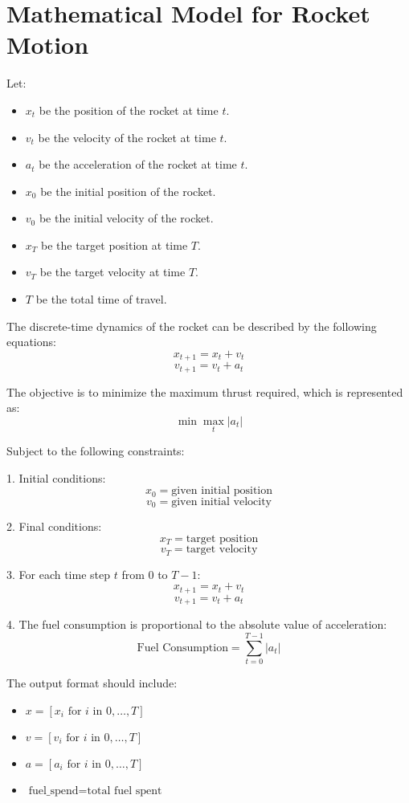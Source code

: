 \documentclass{article}
\begin{document}
\section*{Mathematical Model for Rocket Motion}

Let:
\begin{itemize}
    \item \( x_t \) be the position of the rocket at time \( t \).
    \item \( v_t \) be the velocity of the rocket at time \( t \).
    \item \( a_t \) be the acceleration of the rocket at time \( t \).
    \item \( x_0 \) be the initial position of the rocket.
    \item \( v_0 \) be the initial velocity of the rocket.
    \item \( x_T \) be the target position at time \( T \).
    \item \( v_T \) be the target velocity at time \( T \).
    \item \( T \) be the total time of travel.
\end{itemize}

The discrete-time dynamics of the rocket can be described by the following equations:
\[
x_{t+1} = x_t + v_t
\]
\[
v_{t+1} = v_t + a_t
\]

The objective is to minimize the maximum thrust required, which is represented as:
\[
\min \max_{t} |a_t|
\]

Subject to the following constraints:

1. Initial conditions:
    \[
    x_0 = \text{given initial position}
    \]
    \[
    v_0 = \text{given initial velocity}
    \]

2. Final conditions:
    \[
    x_T = \text{target position}
    \]
    \[
    v_T = \text{target velocity}
    \]

3. For each time step \( t \) from 0 to \( T-1 \):
    \[
    x_{t+1} = x_t + v_t
    \]
    \[
    v_{t+1} = v_t + a_t
    \]

4. The fuel consumption is proportional to the absolute value of acceleration:
   \[
   \text{Fuel Consumption} = \sum_{t=0}^{T-1} |a_t|
   \]

The output format should include:
\begin{itemize}
    \item \( x = [x_i \text{ for } i \text{ in } 0, \ldots, T] \)
    \item \( v = [v_i \text{ for } i \text{ in } 0, \ldots, T] \)
    \item \( a = [a_i \text{ for } i \text{ in } 0, \ldots, T] \)
    \item \( \text{fuel\_spend} = \text{total fuel spent} \)
\end{itemize}
\end{document}
